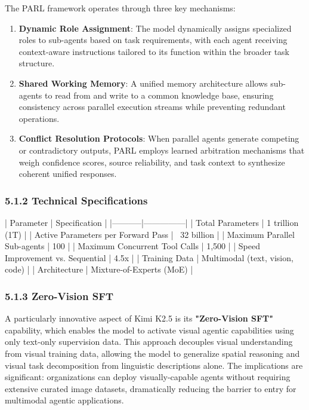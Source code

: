 The PARL framework operates through three key mechanisms:

\begin{enumerate}
    \item \textbf{Dynamic Role Assignment}: The model dynamically assigns specialized roles to sub-agents based on task requirements, with each agent receiving context-aware instructions tailored to its function within the broader task structure.

    \item \textbf{Shared Working Memory}: A unified memory architecture allows sub-agents to read from and write to a common knowledge base, ensuring consistency across parallel execution streams while preventing redundant operations.

    \item \textbf{Conflict Resolution Protocols}: When parallel agents generate competing or contradictory outputs, PARL employs learned arbitration mechanisms that weigh confidence scores, source reliability, and task context to synthesize coherent unified responses.

\end{enumerate}
\subsubsection{5.1.2 Technical Specifications}

| Parameter | Specification |
|-----------|---------------|
| Total Parameters | 1 trillion (1T) |
| Active Parameters per Forward Pass | ~32 billion |
| Maximum Parallel Sub-agents | 100 |
| Maximum Concurrent Tool Calls | 1,500 |
| Speed Improvement vs. Sequential | 4.5x |
| Training Data | Multimodal (text, vision, code) |
| Architecture | Mixture-of-Experts (MoE) |

\subsubsection{5.1.3 Zero-Vision SFT}

A particularly innovative aspect of Kimi K2.5 is its \textbf{"Zero-Vision SFT"} capability, which enables the model to activate visual agentic capabilities using only text-only supervision data. This approach decouples visual understanding from visual training data, allowing the model to generalize spatial reasoning and visual task decomposition from linguistic descriptions alone. The implications are significant: organizations can deploy visually-capable agents without requiring extensive curated image datasets, dramatically reducing the barrier to entry for multimodal agentic applications.

